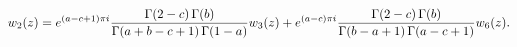 \[w_{2}(z)=e^{(a-c+1)\pi i}\frac{\mathop{\Gamma\/}\nolimits\!\left(2-c\right)%
\mathop{\Gamma\/}\nolimits\!\left(b\right)}{\mathop{\Gamma\/}\nolimits\!\left(%
a+b-c+1\right)\mathop{\Gamma\/}\nolimits\!\left(1-a\right)}w_{3}(z)+e^{(a-c)%
\pi i}\frac{\mathop{\Gamma\/}\nolimits\!\left(2-c\right)\mathop{\Gamma\/}%
\nolimits\!\left(b\right)}{\mathop{\Gamma\/}\nolimits\!\left(b-a+1\right)%
\mathop{\Gamma\/}\nolimits\!\left(a-c+1\right)}w_{6}(z).\]
